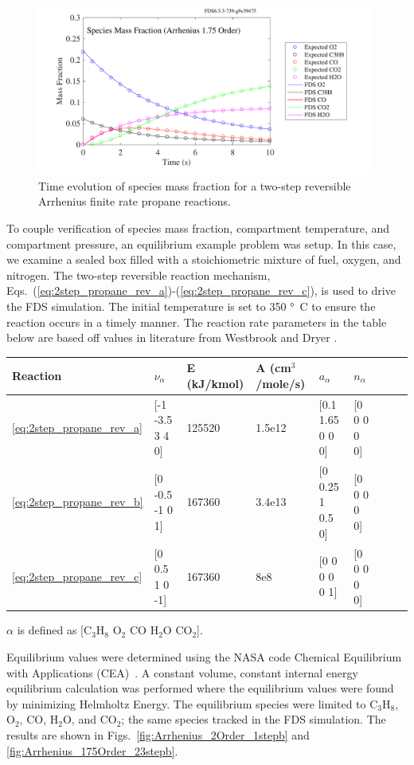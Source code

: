 \documentclass[11pt]{book}
\begin{document}
\begin{figure}[h!]
\begin{center}
\includegraphics[height=2.2in]{SCRIPT_FIGURES/reactionrate_arrhenius_1p75order_2stepr}
\end{center}
\caption[Species evolution in a 1.75-order 2-step reversible finite rate reaction]{Time evolution of species mass fraction for a two-step reversible Arrhenius finite rate propane reactions.}
\label{fig:Arrhenius_175Order_2stepR}
\end{figure}

To couple verification of species mass fraction, compartment temperature, and compartment pressure, an equilibrium example problem was setup. In this case, we examine a sealed box filled with a stoichiometric mixture of fuel, oxygen, and nitrogen. The two-step reversible reaction mechanism, Eqs.~(\ref{eq:2step_propane_rev_a})-(\ref{eq:2step_propane_rev_c}), is used to drive the FDS simulation. The initial temperature is set to 350 \si{\degree C} to ensure the reaction occurs in a timely manner. The reaction rate parameters in the table below are based off values in literature from Westbrook and Dryer \cite{Westbrook:1}.
\begin{center}
\begin{tabular}{|l|l|l|l|l|l|l|l|l|}
\hline Reaction & $\nu_{\alpha}$ & E (kJ/kmol) & A (cm$^3$/mole/s) & $a_{\alpha}$ & $n_{\alpha}$  \\ \hline \hline
\ref{eq:2step_propane_rev_a} & [-1 -3.5 3 4 0] & 125520 & 1.5e12 & [0.1 1.65 0 0 0] & [0 0 0 0 0] \\ \hline
\ref{eq:2step_propane_rev_b} & [0 -0.5 -1 0 1] & 167360 & 3.4e13 & [0 0.25 1 0.5 0] & [0 0 0 0 0] \\ \hline
\ref{eq:2step_propane_rev_c} & [0 0.5 1 0 -1]  & 167360 & 8e8    & [0 0 0 0 0 1]    & [0 0 0 0 0] \\ \hline
\end{tabular}
\vskip8pt
$\alpha$ is defined as [$\mathrm{C_3H_8}$ $\mathrm{O_2}$ $\mathrm{CO}$ $\mathrm{H_2O}$ $\mathrm{CO_2}$].
\end{center}
Equilibrium values were determined using the NASA code Chemical Equilibrium with Applications (CEA)~\cite{Gordon:1994}. A constant volume, constant internal energy equilibrium calculation was performed where the equilibrium values were found by minimizing Helmholtz Energy. The equilibrium species were limited to $\mathrm{C_3H_8}$, $\mathrm{O_2}$, $\mathrm{CO}$, $\mathrm{H_2O}$, and $\mathrm{CO_2}$; the same species tracked in the FDS simulation.  The results are shown in Figs.~\ref{fig:Arrhenius_2Order_1stepb} and \ref{fig:Arrhenius_175Order_23stepb}.
\end{document}

